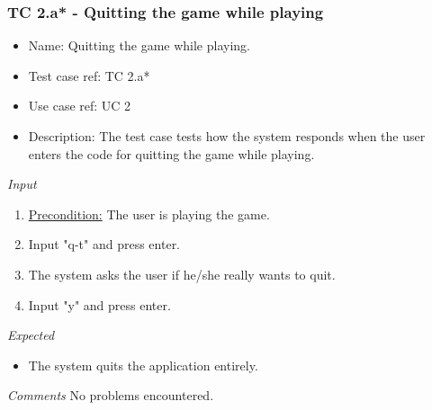 \documentclass[12pt, letterpaper]{article}
\begin{document}
\subsubsection{TC 2.a* - Quitting the game while playing}
\begin{itemize}
	\item Name: Quitting the game while playing.
	\item Test case ref: TC 2.a*
	\item Use case ref: UC 2
	\item Description: The test case tests how the system responds when the user enters the code for quitting the game while playing.
\end{itemize}
\emph{Input}
\begin{enumerate}
	\item \underline{Precondition:} The user is playing the game.
	\item Input "q-t" and press enter.
	\item The system asks the user if he/she really wants to quit.
	\item Input "y" and press enter.
\end{enumerate}
\emph{Expected}
\begin{itemize}
	\item The system quits the application entirely.
\end{itemize}
\begin{Form}
\newline
{}
\newline
\end{Form}
\newline
\emph{Comments}
No problems encountered.
\end{document}
